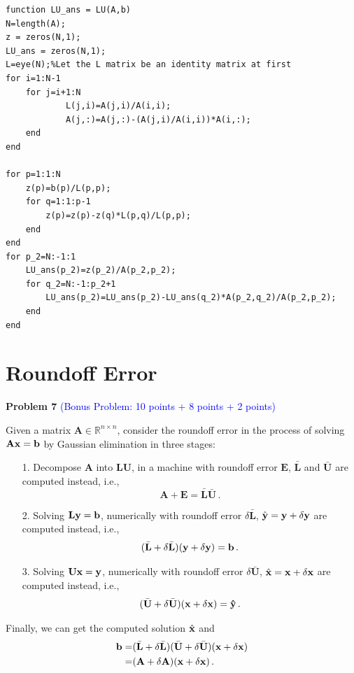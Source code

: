 \documentclass[english,onecolumn]{IEEEtran}
\begin{document}
\begin{enumerate}
\begin{lstlisting}
function LU_ans = LU(A,b)
N=length(A);
z = zeros(N,1);
LU_ans = zeros(N,1);
L=eye(N);%Let the L matrix be an identity matrix at first
for i=1:N-1
    for j=i+1:N            
            L(j,i)=A(j,i)/A(i,i);
            A(j,:)=A(j,:)-(A(j,i)/A(i,i))*A(i,:);
    end
end

for p=1:1:N
    z(p)=b(p)/L(p,p);
    for q=1:1:p-1
        z(p)=z(p)-z(q)*L(p,q)/L(p,p);        
    end
end
for p_2=N:-1:1
    LU_ans(p_2)=z(p_2)/A(p_2,p_2);
    for q_2=N:-1:p_2+1
        LU_ans(p_2)=LU_ans(p_2)-LU_ans(q_2)*A(p_2,q_2)/A(p_2,p_2);        
    end
end
\end{lstlisting}



\end{enumerate}

\newpage

\section{Roundoff Error}
\noindent\textbf{Problem 7} \textcolor{blue}{(Bonus Problem: 10 points + 8 points + 2 points)}

Given a matrix $\mathbf{A}\in \mathbb{R}^{n\times n}$, consider the roundoff error in the process of solving $\mathbf{A}\bf{x} = \bf{b}$ by Gaussian elimination in three stages:
\begin{enumerate}
    \item[1.] Decompose $\mathbf{A}$ into $\mathbf{L}\mathbf{U}$, in a machine with roundoff error $\mathbf{E}$, $\bar{\mathbf{L}}$ and $\bar{\mathbf{U}}$ are computed instead, i.e., 
    \begin{equation*}
        \mathbf{A} + \mathbf{E} = \bar{\mathbf{L}}\bar{\mathbf{U}}\,.
    \end{equation*}
    \item[2.] Solving $\mathbf{L}\bf{y} = \bf{b}$, numerically with roundoff error $\delta \mathbf{\bar{L}}$, $\hat{\mathbf{y}} = \bf{y}+\delta \bf{y}$ are computed instead, i.e.,
    \begin{equation*}
        (\bar{\mathbf{L}}+\delta \bar{\mathbf{L}})(\bf{y}+\delta \bf{y}) = \bf{b}\,.
    \end{equation*}
    \item[3.] Solving $\mathbf{U}\bf{x} = \bf{y}$, numerically with roundoff error $\delta \mathbf{\bar{U}}$, $\hat{\bf{x}} = \bf{x}+\delta \bf{x}$ are computed instead, i.e.,
    \begin{equation*}
        (\bar{\mathbf{U}}+\delta \bar{\mathbf{U}})(\bf{x}+\delta \bf{x}) = \hat{y}\,.
    \end{equation*}
\end{enumerate}
Finally, we can get the computed solution $\hat{\bf{x}}$ and 
\begin{align*}
    \bf{b} = &(\bar{\mathbf{L}}+\delta \bar{\mathbf{L}})(\bar{\mathbf{U}}+\delta \bar{\mathbf{U}})(\bf{x}+\delta \bf{x})\\
     = & (\mathbf{A}+\delta \mathbf{A})(\bf{\bf{x}}+\delta \bf{\bf{x}})\,.
\end{align*}
\end{document}
